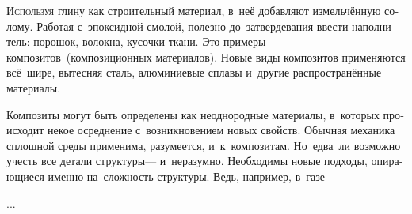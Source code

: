 

\thispagestyle{empty}

\label{chapter:composites}



\begin{otherlanguage}{russian}

\lettrine[lines=2, findent=2pt, nindent=0pt]{И}{спользуя} глину как строительный материал, в~неё добавляют измельчённую солому. Работая с~эпоксидной смолой, полезно до~затвердевания ввести наполнитель: порошок, волокна, кусочки ткани. Это примеры композитов~(композиционных материалов). Новые виды композитов применяются всё~шире, вытесняя сталь, алюминиевые сплавы и~другие распространённые материалы.

Композиты могут быть определены как неоднородные материалы, в~которых происходит некое осреднение с~возникновением новых свойств. Обычная механика сплошной среды применима, разумеется, и~к~композитам. Но~едва~ли возможно учесть все детали структуры\:--- и~неразумно. Необходимы новые подходы, опирающиеся именно на~сложность структуры. Ведь, например, в~газе

...



\end{otherlanguage}



